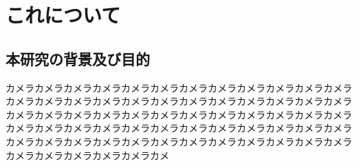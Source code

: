 \documentclass[11pt, a4paper]{jsarticle}
\numberwithin{equation}{section}
\newcommand{\newsection}[1]{\clearpage \vspace*{20zw} \section{#1} \clearpage}
\begin{document}

{}
\tableofcontents
\clearpage
{}

\newsection{これについて}

\subsection{本研究の背景及び目的}
カメラカメラカメラカメラカメラカメラカメラカメラカメラカメラカメラカメラカメラカメラカメラカメラカメラカメラカメラカメラカメラカメラカメラカメラカメラカメラカメラカメラカメラカメラカメラカメラカメラカメラカメラカメラカメラカメラカメラカメラカメラカメラカメラカメラカメラカメラカメラカメラカメラカメラカメラカメラカメラカメラカメラカメラカメラカメラカメラカメラカメラカメラカメラカメラカメラカメ
\end{document}

